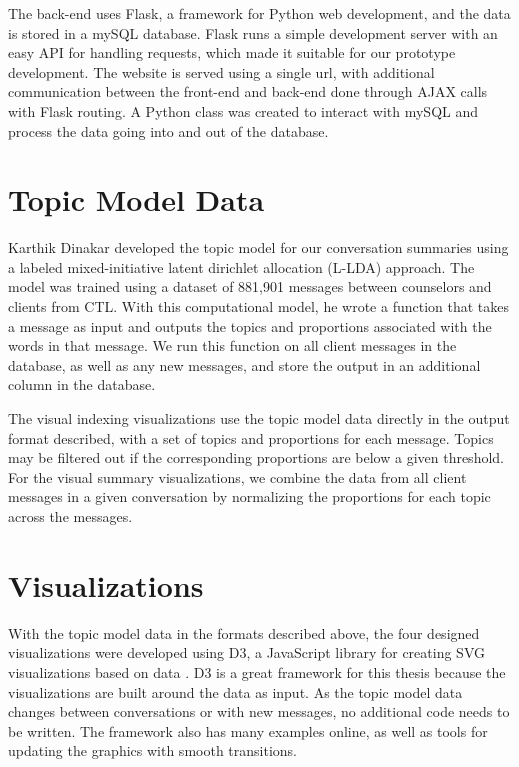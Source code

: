 The back-end uses Flask, a framework for Python web development, and the data is stored in a mySQL database. Flask runs a simple development server with an easy API for handling requests, which made it suitable for our prototype development. The website is served using a single url, with additional communication between the front-end and back-end done through AJAX calls with Flask routing. A Python class was created to interact with mySQL and process the data going into and out of the database.

\section{Topic Model Data}

Karthik Dinakar developed the topic model for our conversation summaries using a labeled mixed-initiative latent dirichlet allocation (L-LDA) approach. The model was trained using a dataset of 881,901 messages between counselors and clients from CTL. With this computational model, he wrote a function that takes a message as input and outputs the topics and proportions associated with the words in that message. We run this function on all client messages in the database, as well as any new messages, and store the output in an additional column in the database.

The visual indexing visualizations use the topic model data directly in the output format described, with a set of topics and proportions for each message. Topics may be filtered out if the corresponding proportions are below a given threshold. For the visual summary visualizations, we combine the data from all client messages in a given conversation by normalizing the proportions for each topic across the messages.

\section{Visualizations}

With the topic model data in the formats described above, the four designed visualizations were developed using D3, a JavaScript library for creating SVG visualizations based on data \cite{d3}. D3 is a great framework for this thesis because the visualizations are built around the data as input. As the topic model data changes between conversations or with new messages, no additional code needs to be written. The framework also has many examples online, as well as tools for updating the graphics with smooth transitions.

